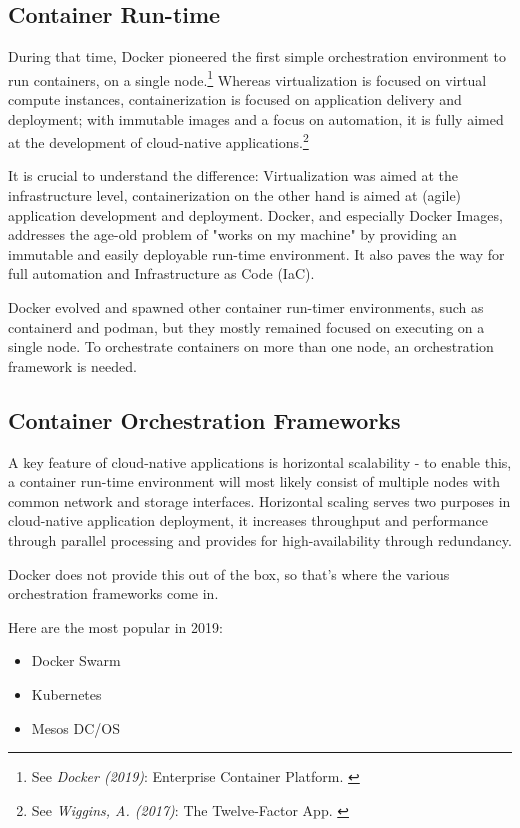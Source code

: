 \subsection{Container Run-time}

During that time, Docker pioneered the first simple orchestration environment to run containers, on a single node.\footnote{See \textit{Docker (2019)}: Enterprise Container Platform. \cite{docker}} Whereas virtualization is focused on virtual compute instances, containerization is focused on application delivery and deployment; with immutable images and a focus on automation, it is fully aimed at the development of cloud-native applications.\footnote{See \textit{Wiggins, A. (2017)}: The Twelve-Factor App. \cite{12factor}}

It is crucial to understand the difference: Virtualization was aimed at the infrastructure level, containerization on the other hand is aimed at (agile) application development and deployment. Docker, and especially Docker Images, addresses the age-old problem of "works on my machine" by providing an immutable and easily deployable run-time environment. It also paves the way for full automation and Infrastructure as Code (IaC).

Docker evolved and spawned other container run-timer environments, such as containerd and podman, but they mostly remained focused on executing on a single node. To orchestrate containers on more than one node, an orchestration framework is needed. 

\subsection{Container Orchestration Frameworks}

A key feature of cloud-native applications is horizontal scalability - to enable this, a container run-time environment will most likely consist of multiple nodes with common network and storage interfaces. Horizontal scaling serves two purposes in cloud-native application deployment, it increases throughput and performance through parallel processing and provides for high-availability through redundancy.

Docker does not provide this out of the box, so that's where the various orchestration frameworks come in. 

Here are the most popular in 2019:
\begin{itemize}
\item Docker Swarm
\item Kubernetes
\item Mesos DC/OS
\end{itemize}

